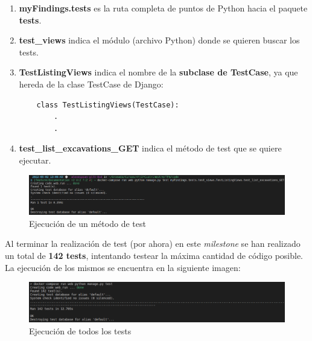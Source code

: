     \begin{enumerate}
        \item \textbf{myFindings.tests} es la ruta completa de puntos de Python hacia el
        paquete \textbf{tests}.
        \item \textbf{test\_views} indica el módulo (archivo Python) donde se quieren
        buscar los tests.
        \item \textbf{TestListingViews} indica el nombre de la \textbf{subclase de TestCase},
        ya que hereda de la clase TestCase de Django:
    
    \begin{verbatim}
    class TestListingViews(TestCase):
        .
        .
    \end{verbatim}
        \item \textbf{test\_list\_excavations\_GET} indica el método de test que se quiere
        ejecutar.
    \end{enumerate}

    \begin{figure}[H]
        \centering
        \includegraphics[scale=0.27]{imagenes/one-test.png}
        \caption{Ejecución de un método de test}
        \label{fig:one-test}
    \end{figure}

Al terminar la realización de test (por ahora) en este \textit{milestone} se han realizado
un total de \textbf{142 tests}, intentando testear la máxima cantidad de código posible.
La ejecución de los mismos se encuentra en la siguiente imagen:

    \begin{figure}[H]
        \centering
        \includegraphics[scale=0.30]{imagenes/all-tests.png}
        \caption{Ejecución de todos los tests}
        \label{fig:all-tests}
    \end{figure}

